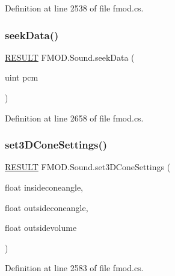 Definition at line 2538 of file fmod.\+cs.

\mbox{\label{class_f_m_o_d_1_1_sound_aead3642d75d68acbe010a7dfeccb37f6}} 
\subsubsection{\texorpdfstring{seek\+Data()}{seekData()}}
{\footnotesize\ttfamily \hyperlink{namespace_f_m_o_d_a305d1176ef3f8c8815861a60407ac33d}{R\+E\+S\+U\+LT} F\+M\+O\+D.\+Sound.\+seek\+Data (\begin{DoxyParamCaption}\item[{uint}]{pcm }\end{DoxyParamCaption})}



Definition at line 2658 of file fmod.\+cs.

\mbox{\label{class_f_m_o_d_1_1_sound_a663512bb4de90f93f8d8cc13bde975b6}} 
\subsubsection{\texorpdfstring{set3\+D\+Cone\+Settings()}{set3DConeSettings()}}
{\footnotesize\ttfamily \hyperlink{namespace_f_m_o_d_a305d1176ef3f8c8815861a60407ac33d}{R\+E\+S\+U\+LT} F\+M\+O\+D.\+Sound.\+set3\+D\+Cone\+Settings (\begin{DoxyParamCaption}\item[{float}]{insideconeangle,  }\item[{float}]{outsideconeangle,  }\item[{float}]{outsidevolume }\end{DoxyParamCaption})}



Definition at line 2583 of file fmod.\+cs.

\mbox{\label{class_f_m_o_d_1_1_sound_a5421296ff25765c7bcb0d619535ef300}} 
